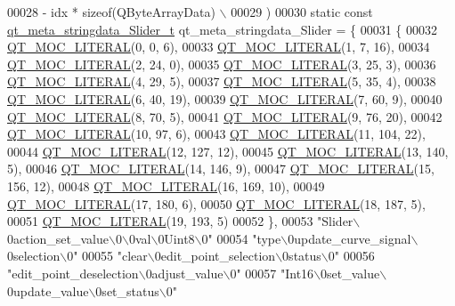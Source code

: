 \begin{DoxyCode}
00028 \textcolor{preprocessor}{        - idx * sizeof(QByteArrayData) \(\backslash\)}
00029 \textcolor{preprocessor}{    )}
00030 \textcolor{keyword}{static} \textcolor{keyword}{const} \hyperlink{a00019_d8/dfa/a00121}{qt\_meta\_stringdata\_Slider\_t} qt\_meta\_stringdata\_Slider = \{
00031     \{
00032 \hyperlink{a00019_a75bb9482d242cde0a06c9dbdc6b83abe}{QT\_MOC\_LITERAL}(0, 0, 6),
00033 \hyperlink{a00019_a75bb9482d242cde0a06c9dbdc6b83abe}{QT\_MOC\_LITERAL}(1, 7, 16),
00034 \hyperlink{a00019_a75bb9482d242cde0a06c9dbdc6b83abe}{QT\_MOC\_LITERAL}(2, 24, 0),
00035 \hyperlink{a00019_a75bb9482d242cde0a06c9dbdc6b83abe}{QT\_MOC\_LITERAL}(3, 25, 3),
00036 \hyperlink{a00019_a75bb9482d242cde0a06c9dbdc6b83abe}{QT\_MOC\_LITERAL}(4, 29, 5),
00037 \hyperlink{a00019_a75bb9482d242cde0a06c9dbdc6b83abe}{QT\_MOC\_LITERAL}(5, 35, 4),
00038 \hyperlink{a00019_a75bb9482d242cde0a06c9dbdc6b83abe}{QT\_MOC\_LITERAL}(6, 40, 19),
00039 \hyperlink{a00019_a75bb9482d242cde0a06c9dbdc6b83abe}{QT\_MOC\_LITERAL}(7, 60, 9),
00040 \hyperlink{a00019_a75bb9482d242cde0a06c9dbdc6b83abe}{QT\_MOC\_LITERAL}(8, 70, 5),
00041 \hyperlink{a00019_a75bb9482d242cde0a06c9dbdc6b83abe}{QT\_MOC\_LITERAL}(9, 76, 20),
00042 \hyperlink{a00019_a75bb9482d242cde0a06c9dbdc6b83abe}{QT\_MOC\_LITERAL}(10, 97, 6),
00043 \hyperlink{a00019_a75bb9482d242cde0a06c9dbdc6b83abe}{QT\_MOC\_LITERAL}(11, 104, 22),
00044 \hyperlink{a00019_a75bb9482d242cde0a06c9dbdc6b83abe}{QT\_MOC\_LITERAL}(12, 127, 12),
00045 \hyperlink{a00019_a75bb9482d242cde0a06c9dbdc6b83abe}{QT\_MOC\_LITERAL}(13, 140, 5),
00046 \hyperlink{a00019_a75bb9482d242cde0a06c9dbdc6b83abe}{QT\_MOC\_LITERAL}(14, 146, 9),
00047 \hyperlink{a00019_a75bb9482d242cde0a06c9dbdc6b83abe}{QT\_MOC\_LITERAL}(15, 156, 12),
00048 \hyperlink{a00019_a75bb9482d242cde0a06c9dbdc6b83abe}{QT\_MOC\_LITERAL}(16, 169, 10),
00049 \hyperlink{a00019_a75bb9482d242cde0a06c9dbdc6b83abe}{QT\_MOC\_LITERAL}(17, 180, 6),
00050 \hyperlink{a00019_a75bb9482d242cde0a06c9dbdc6b83abe}{QT\_MOC\_LITERAL}(18, 187, 5),
00051 \hyperlink{a00019_a75bb9482d242cde0a06c9dbdc6b83abe}{QT\_MOC\_LITERAL}(19, 193, 5)
00052     \},
00053     \textcolor{stringliteral}{"Slider\(\backslash\)0action\_set\_value\(\backslash\)0\(\backslash\)0val\(\backslash\)0Uint8\(\backslash\)0"}
00054     \textcolor{stringliteral}{"type\(\backslash\)0update\_curve\_signal\(\backslash\)0selection\(\backslash\)0"}
00055     \textcolor{stringliteral}{"clear\(\backslash\)0edit\_point\_selection\(\backslash\)0status\(\backslash\)0"}
00056     \textcolor{stringliteral}{"edit\_point\_deselection\(\backslash\)0adjust\_value\(\backslash\)0"}
00057     \textcolor{stringliteral}{"Int16\(\backslash\)0set\_value\(\backslash\)0update\_value\(\backslash\)0set\_status\(\backslash\)0"}

\end{DoxyCode}
